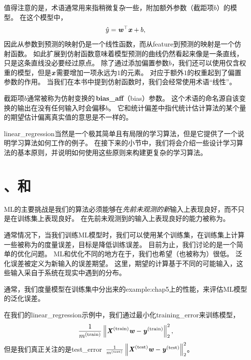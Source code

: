 值得注意的是，术语通常用来指稍微复杂一些，附加额外参数（截距项$b$）的模型。
在这个模型中，
\begin{equation}
    \hat{y} = \boldsymbol{\mathit{w}}^\top \boldsymbol{\mathit{x}} + b,
\end{equation}
因此从参数到预测的映射仍是一个线性函数，而从\gls{feature}到预测的映射是一个仿射函数。
如此扩展到仿射函数意味着模型预测的曲线仍然看起来像是一条直线，只是这条直线没必要经过原点。
除了通过添加偏置参数$b$，我们还可以使用仅含权重的模型，但是$\boldsymbol{\mathit{x}}$需要增加一项永远为$1$的元素。
对应于额外$1$的权重起到了偏置参数的作用。
当我们在本书中提到仿射函数时，我们会经常使用术语``线性''。


截距项$b$通常被称为仿射变换的\,\textbf{\gls{bias_aff}}（bias）参数。
这个术语的命名源自该变换的输出在没有任何输入时会偏移$b$。
它和统计偏差中指代统计估计算法的某个量的期望估计偏离真实值的意思是不一样的。

\gls{linear_regression}当然是一个极其简单且有局限的学习算法，但是它提供了一个说明学习算法如何工作的例子。
在接下来的小节中，我们将会介绍一些设计学习算法的基本原则，并说明如何使用这些原则来构建更复杂的学习算法。

\section{、和}
\label{sec:capacity_overfitting_and_underfitting}
\gls{ML}的主要挑战是我们的算法必须能够在\emph{先前未观测的新}输入上表现良好，而不只是在训练集上表现良好。 %
在先前未观测到的输入上表现良好的能力被称为。

通常情况下，当我们训练\gls{ML}模型时，我们可以使用某个训练集，在训练集上计算一些被称为的度量误差，目标是降低训练误差。
目前为止，我们讨论的是一个简单的优化问题。
\gls{ML}和优化不同的地方在于，我们也希望（也被称为）很低。
泛化误差被定义为新输入的误差期望。
这里，期望的计算基于不同的可能输入，这些输入采自于系统在现实中遇到的分布。

通常，我们度量模型在训练集中分出来的\gls{example:chap5}上的性能，来评估\gls{ML}模型的泛化误差。

在我们的\gls{linear_regression}示例中，我们通过最小化\gls{training_error}来训练模型，
\begin{equation}
    \frac{1}{m^{(\text{train})}} \left\lVert\boldsymbol{\mathit{X}}^{(\text{train})}\boldsymbol{\mathit{w}} - \boldsymbol{\mathit{y}}^{(\text{train})}\right\rVert_2^2,
\end{equation}
但是我们真正关注的是\gls{test_error}~$\frac{1}{m^{(\text{test})}} \left\lVert\boldsymbol{\mathit{X}}^{(\text{test})}\boldsymbol{\mathit{w}} - \boldsymbol{\mathit{y}}^{(\text{test})}\right\rVert_2^2$。

